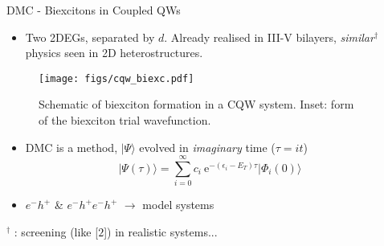 \documentclass[hyperref={draft}]{beamer}
\newcommand{\red}[1]{{\bf\color{red}{#1}}}
\newcommand{\ket}[1]{\lvert {#1} \rangle}
\begin{document}
\begin{frame}[fragile]
\begin{columns}[T]
\begin{column}{.46\textwidth}
\begin{block}{DMC - Biexcitons in Coupled QWs}
\begin{itemize}
\item Two 2DEGs, separated by $d$. Already realised in III-V bilayers, \textit{similar}$^{\dagger}$ physics seen in \red{truly} 2D heterostructures.
\end{itemize}
\begin{figure}[H]
	\texttt{[image: figs/cqw\_biexc.pdf]}
	\caption{Schematic of biexciton formation in a CQW system. Inset: form of the biexciton trial wavefunction.}
	\label{biexc_dmc}
\end{figure}

\vspace{1cm}
\begin{itemize}
\item DMC is a \red{projection} method, $\ket{\Psi}$ evolved in \emph{imaginary} time ($\tau=it$)
\begin{equation}
	\ket{\Psi(\tau)} = \sum^{\infty}_{i=0}c_i\ \mathrm{e}^{-(\epsilon_i - E_T)\tau}\ket{\Phi_i(0)}
\end{equation}
\item $e^-h^+$ \& $e^-h^+e^-h^+$ $\rightarrow$ \red{nodeless} model systems
\end{itemize}
\vspace{1cm}
$^{\dagger}$ \red{Problem}: screening (like [$2$]) in realistic systems...

\end{block}

\end{column}
\begin{column}{.04\textwidth}


\end{column}
\hfill



\end{columns}
\end{frame}
\end{document}
